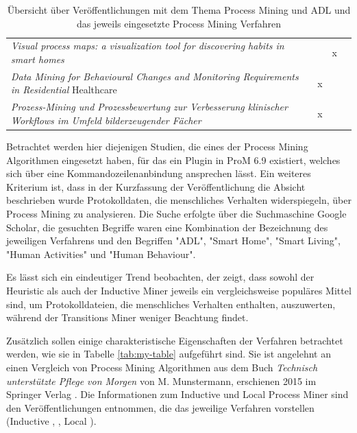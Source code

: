 \begin{table}[!ht]
\begin{tabularx}{\textwidth}{b ccc}
\textit{Visual process maps: a visualization tool for discovering habits in smart homes} \cite{adl9}                            &                                        & x                                      &                                         \\
\textit{Data Mining for Behavioural Changes and Monitoring Requirements in Residential} Healthcare \cite{adl10}                  & x                                      &                                        &                                         \\
\textit{Prozess-Mining und Prozessbewertung zur Verbesserung klinischer Workflows im Umfeld bilderzeugender Fächer} \cite{adl11} & x                                      &                                        &                                         \\ \hline

\end{tabularx}

\caption{Übersicht über Veröffentlichungen mit dem Thema Process Mining und ADL und das jeweils eingesetzte Process Mining Verfahren}
 \label{tab:miningPaper}
\end{table}
\normalsize
Betrachtet werden hier diejenigen Studien, die eines der Process Mining Algorithmen eingesetzt haben, für das ein Plugin in ProM 6.9 existiert, welches sich über eine Kommandozeilenanbindung ansprechen lässt. Ein weiteres Kriterium ist, dass in der Kurzfassung der Veröffentlichung die Absicht beschrieben wurde Protokolldaten, die menschliches Verhalten widerspiegeln, über Process Mining zu analysieren. Die Suche erfolgte über die Suchmaschine Google Scholar, die gesuchten Begriffe waren eine Kombination der Bezeichnung des jeweiligen Verfahrens und den Begriffen "ADL", "Smart Home", "Smart Living", "Human Activities" und "Human Behaviour". 

Es lässt sich ein eindeutiger Trend beobachten, der zeigt, dass sowohl der Heuristic als auch der Inductive Miner jeweils ein vergleichsweise populäres Mittel sind, um Protokolldateien, die menschliches Verhalten enthalten, auszuwerten, während der Transitions Miner weniger Beachtung findet. 

Zusätzlich sollen einige charakteristische Eigenschaften der Verfahren betrachtet werden, wie sie in Tabelle \ref{tab:my-table} aufgeführt sind. Sie ist angelehnt an einen Vergleich von Process Mining Algorithmen aus dem Buch \textit{Technisch unterstützte Pflege von Morgen} von M. Munstermann, erschienen 2015 im Springer Verlag \cite{munster}. Die Informationen zum Inductive und Local Process Miner sind den  Veröffentlichungen entnommen, die das jeweilige Verfahren vorstellen (Inductive \cite{inducIMining}, \cite{inducFMining}, Local \cite{localMining}). 

